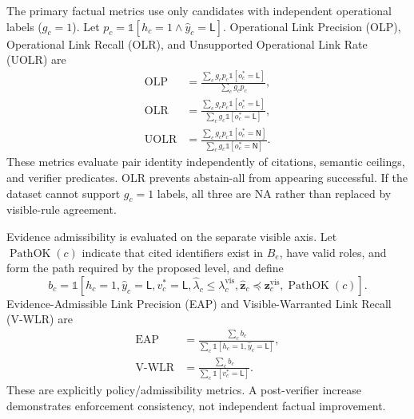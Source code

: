 \documentclass[conference]{IEEEtran}
\newcommand{\NA}{\textsc{NA}}
\begin{document}
The primary factual metrics use only candidates with independent operational labels ($g_c=1$). Let $p_c=\mathbb{1}[h_c=1\land\hat y_c=\mathsf{L}]$. Operational Link Precision (OLP), Operational Link Recall (OLR), and Unsupported Operational Link Rate (UOLR) are
\begin{align}
\operatorname{OLP}&=\frac{\sum_c g_cp_c\mathbb{1}[o_c^*=\mathsf{L}]}{\sum_c g_cp_c},\\
\operatorname{OLR}&=\frac{\sum_c g_cp_c\mathbb{1}[o_c^*=\mathsf{L}]}{\sum_c g_c\mathbb{1}[o_c^*=\mathsf{L}]},\\
\operatorname{UOLR}&=\frac{\sum_c g_cp_c\mathbb{1}[o_c^*=\mathsf{N}]}{\sum_c g_c\mathbb{1}[o_c^*=\mathsf{N}]}.
\end{align}
These metrics evaluate pair identity independently of citations, semantic ceilings, and verifier predicates. OLR prevents abstain-all from appearing successful. If the dataset cannot support $g_c=1$ labels, all three are \NA{} rather than replaced by visible-rule agreement.

Evidence admissibility is evaluated on the separate visible axis. Let $\operatorname{PathOK}(c)$ indicate that cited identifiers exist in $B_e$, have valid roles, and form the path required by the proposed level, and define
\begin{equation}
b_c=\mathbb{1}[h_c=1,\hat y_c=\mathsf{L},v_c^*=\mathsf{L},\hat\lambda_c\leq\lambda_c^{\mathrm{vis}},\hat{\mathbf z}_c\preceq\mathbf z_c^{\mathrm{vis}},\operatorname{PathOK}(c)].
\end{equation}
Evidence-Admissible Link Precision (EAP) and Visible-Warranted Link Recall (V-WLR) are
\begin{align}
\operatorname{EAP}&=\frac{\sum_c b_c}{\sum_c\mathbb{1}[h_c=1,\hat y_c=\mathsf{L}]},\\
\operatorname{V\text{-}WLR}&=\frac{\sum_c b_c}{\sum_c\mathbb{1}[v_c^*=\mathsf{L}]}.
\end{align}
These are explicitly policy/admissibility metrics. A post-verifier increase demonstrates enforcement consistency, not independent factual improvement.
\end{document}
